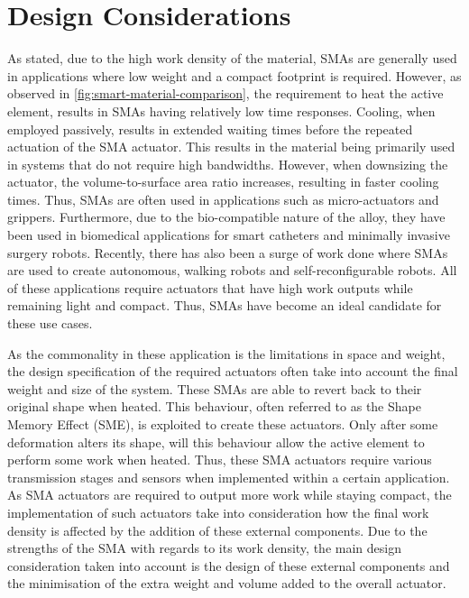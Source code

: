 \section*{Design Considerations}
As stated, due to the high work density of the material, SMAs are generally used in applications where low weight and a compact footprint is required. However, as observed in \cref{fig:smart-material-comparison}, the requirement to heat the active element, results in SMAs having relatively low time responses. Cooling, when employed passively, results in extended waiting times before the repeated actuation of the SMA actuator. This results in the material being primarily used in systems that do not require high bandwidths. However, when downsizing the actuator, the volume-to-surface area ratio increases, resulting in faster cooling times. Thus, SMAs are often used in applications such as micro-actuators and grippers. Furthermore, due to the bio-compatible nature of the alloy, they have been used in biomedical applications for smart catheters and minimally invasive surgery robots. Recently, there has also been a surge of work done where SMAs are used to create autonomous, walking robots and self-reconfigurable robots. All of these applications require actuators that have high work outputs while remaining light and compact. Thus, SMAs have become an ideal candidate for these use cases.

As the commonality in these application is the limitations in space and weight, the design specification of the required actuators often take into account the final weight and size of the system. These SMAs are able to revert back to their original shape when heated. This behaviour, often referred to as the Shape Memory Effect (SME), is exploited to create these actuators. Only after some deformation alters its shape, will this behaviour allow the active element to perform some work when heated. Thus, these SMA actuators require various transmission stages and sensors when implemented within a certain application. As SMA actuators are required to output more work while staying compact, the implementation of such actuators take into consideration how the final work density is affected by the addition of these external components. Due to the strengths of the SMA with regards to its work density, the main design consideration taken into account is the design of these external components and the minimisation of the extra weight and volume added to the overall actuator.

